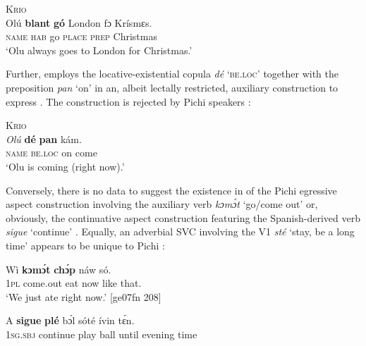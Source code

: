 \ea%
    \label{ex:1:12}
\textsc{Krio}\\
    \gll   Olú    \textbf{blant}  \textbf{gó}  London  fɔ  Krísmɛs.\\
\textsc{name}  \textsc{hab}    go  \textsc{place}  \textsc{prep}  Christmas\\

\glt ‘Olu always goes to London for Christmas.’  \citep[181]{YillahCorcoran2007}
\z

Further,  employs the locative-existential copula \textit{dé} \textsc{‘be.loc’} together with the preposition \textit{pan} ‘on’ in an, albeit lectally restricted, auxiliary construction to express  . The construction is rejected by Pichi speakers :


\ea%
    \label{ex:1:13}
\textsc{Krio}\\
    \gll   \textit{Olú}   \textbf{dé}   \textbf{pan}    kám.\\
\textsc{name}  \textsc{be.loc}  on    come\\

\glt ‘Olu is coming (right now).’ \citep[179]{YillahCorcoran2007}
\z


\z

Conversely, there is no data to suggest the existence in  of the Pichi egressive aspect construction involving the auxiliary verb \textit{kɔmɔ́t} ‘go/come out’  or, obviously, the continuative aspect construction featuring the Spanish-derived verb \textit{sigue} ‘continue’ . Equally, an adverbial SVC involving the V1 \textit{sté} ‘stay, be a long time’ appears to be unique to Pichi : 


\ea%
    \label{ex:1:15}
    \gll   Wì  \textbf{kɔmɔ́t}    \textbf{chɔ́p}  náw    só.\\
 \textsc{1pl}  come.out  eat    now    like that.\\
\glt ‘We just ate right now.’ [ge07fn 208]
\z


\ea%
    \label{ex:1:16}
    \gll   A    \textbf{sigue}    \textbf{plé}    bɔ́l  sóté    ívin    tɛ́n.\\
\textsc{1sg.sbj}  continue    play    ball  until  evening  time\\

